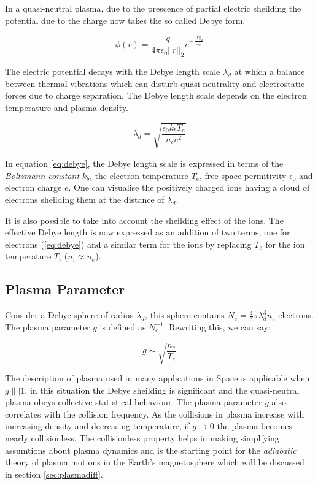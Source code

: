 In a quasi-neutral plasma, due to the prescence of partial electric sheilding the potential due to the charge 
now takes the so called Debye form.

\begin{equation}
    \phi(r) = \frac{q}{4\pi\epsilon_0 ||r||_2} e^{-\frac{||r||_2}{\lambda_d}}
\end{equation}

The electric potential decays with the Debye length scale $\lambda_d$ at which a balance between thermal vibrations 
which can disturb quasi-neutrality and electrostatic forces due to charge separation. The Debye length scale depends
on the electron temperature and plasma density.

\begin{equation}\label{eq:debye}
    \lambda_d = \sqrt{\frac{\epsilon_0 k_b T_e}{n_e e^2}}
\end{equation}

In equation \ref{eq:debye}, the Debye length scale is expressed in terms of the \emph{Boltzmann constant} $k_b$, 
the electron temperature $T_e$, free space permitivity $\epsilon_0$ and electron charge $e$. One can visualise the 
positively charged ions having a cloud of electrons sheilding them at the distance of $\lambda_d$. 

It is also possible to take into account the sheilding effect of the ions. The effective Debye length is now 
expressed as an addition of two terms, one for electrons (\ref{eq:debye}) and a similar term for the ions by replacing 
$T_e$ for the ion temperature $T_i$ ($n_i \approx n_e$). 

\subsection*{Plasma Parameter}

Consider a Debye sphere of radius $\lambda_d$, this sphere contains $N_e = \frac{4}{3}\pi \lambda^3_d n_e$ electrons. 
The plasma parameter $g$ is defined as $N_{e}^{-1}$. Rewriting this, we can say:

\begin{equation}
    g \sim \sqrt{\frac{n_e}{T_e}}
\end{equation}

The description of plasma used in many applications in Space is applicable when $g \|| 1$, in this situation 
the Debye sheilding is significant and the quasi-neutral plasma obeys collective statistical behaviour. 
The plasma parameter $g$ also correlates with the collision frequency. As the collisions in plasma increase 
with increasing density and decreasing temperature, if $g \longrightarrow 0$ the plasma becomes nearly collisionless. 
The collisionless property helps in making simplfying assumtions about plasma dynamics and is the starting point 
for the \emph{adiabatic} theory of plasma motions in the Earth's magnetosphere which will be discussed in section 
\ref{sec:plasmadiff}.

